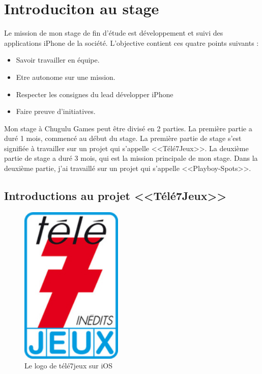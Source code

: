 \section{Introduciton au stage} %
Le mission de mon stage de fin d'étude est développement et suivi des applications iPhone de la société. L'objective contient ces quatre points suivants : 

\begin{itemize}
	\item Savoir travailler en équipe.
	\item Etre autonome sur une mission.
	\item Respecter les consignes du lead développer iPhone
	\item Faire preuve d'initiatives.
\end{itemize}

Mon stage à Chugulu Games peut être divisé en 2 parties. La première partie a duré 1 mois, commencé au début du stage. La première partie de stage s'est signifiée à travailler sur un projet qui s'appelle <<Télé7Jeux>>. La deuxième partie de stage a duré 3 mois, qui est la mission principale de mon stage. Dans la deuxième partie, j'ai travaillé sur un projet qui s'appelle <<Playboy-Spots>>.

\subsection{Introductions au projet <<Télé7Jeux>>} %
\label{ssub:introductions_au_projet_télé7jeux}


\begin{figure}[htbp]
	\centering
		\includegraphics[height=3in]{Image/tele_7_jeux_logo_lien_logo.jpg}
	\caption{Le logo de télé7jeux sur iOS}
	\label{fig:Image_tele_7_jeux_logo_lien_logo}
\end{figure}




